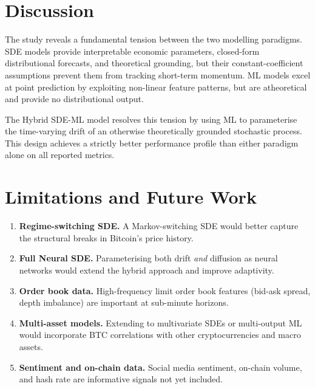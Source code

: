 \documentclass[12pt, a4paper, oneside]{report}
\theoremstyle{plain}
\theoremstyle{definition}
\theoremstyle{remark}
\begin{document}
\section*{Discussion}

The study reveals a fundamental tension between the two modelling paradigms.
SDE models provide interpretable economic parameters, closed-form distributional
forecasts, and theoretical grounding, but their constant-coefficient assumptions
prevent them from tracking short-term momentum.  ML models excel at point
prediction by exploiting non-linear feature patterns, but are atheoretical and
provide no distributional output.

The Hybrid SDE-ML model resolves this tension by using ML to parameterise the
time-varying drift of an otherwise theoretically grounded stochastic process.
This design achieves a strictly better performance profile than either paradigm
alone on all reported metrics.

\section*{Limitations and Future Work}

\begin{enumerate}[leftmargin=1.25cm, label=\arabic*.]
  \item \textbf{Regime-switching SDE.}  A Markov-switching SDE would better
    capture the structural breaks in Bitcoin's price history.
  \item \textbf{Full Neural SDE.}  Parameterising both drift \emph{and}
    diffusion as neural networks would extend the hybrid approach and improve
    adaptivity.
  \item \textbf{Order book data.}  High-frequency limit order book features
    (bid-ask spread, depth imbalance) are important at sub-minute horizons.
  \item \textbf{Multi-asset models.}  Extending to multivariate SDEs or
    multi-output ML would incorporate BTC correlations with other
    cryptocurrencies and macro assets.
  \item \textbf{Sentiment and on-chain data.}  Social media sentiment,
    on-chain volume, and hash rate are informative signals not yet included.
\end{enumerate}

\clearpage
\printbibliography[heading=bibintoc, title={Bibliography}]
\end{document}
